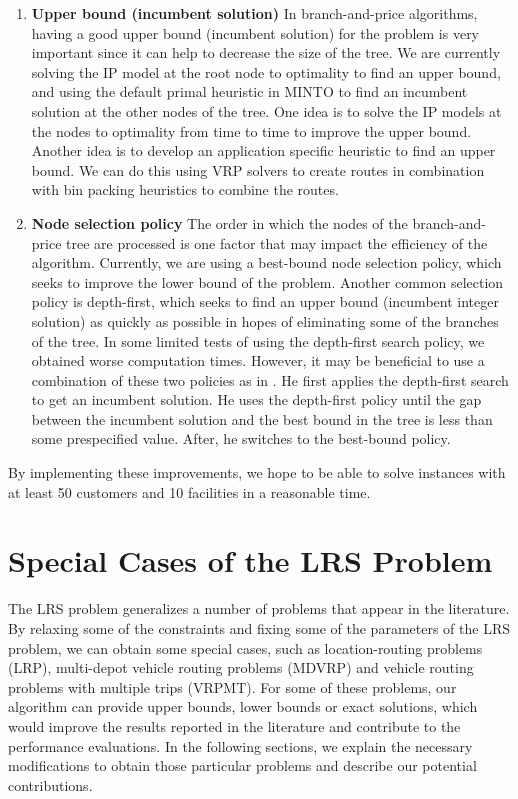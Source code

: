 \begin{enumerate}
\item {\bf Upper bound (incumbent solution)} In branch-and-price algorithms,
  having a good upper bound (incumbent solution) for the problem is very 
  important since it can help to decrease the size of the tree. We are currently 
  solving the IP model at the root node to optimality to find an upper bound, and
  using the default primal heuristic in MINTO to find an incumbent solution at
  the other nodes of the tree. One idea is to solve the IP models at the nodes 
  to optimality from time to time to improve the upper bound. Another idea is to 
  develop an application specific heuristic to find an upper bound. We can do 
  this using VRP solvers to create routes in combination with bin packing 
  heuristics to combine the routes.
\item {\bf Node selection policy} The order in which the nodes of the 
  branch-and-price tree are processed is one factor that may impact the 
  efficiency of the algorithm. Currently, we are using a best-bound node selection
  policy, which seeks to improve the lower bound of the problem. Another common
  selection policy is depth-first, which seeks to find an upper bound 
  (incumbent integer solution) as quickly as possible in hopes of eliminating 
  some of the branches of the tree. In some limited tests of using the depth-first 
  search policy, we obtained worse computation times. However, it may be 
  beneficial to use a combination of these two policies as in \citet{Vanderbeck}.
  He first applies the depth-first search to get an incumbent solution. He uses 
  the depth-first policy until the gap between the incumbent solution and the best 
  bound in the tree is less than some prespecified value. After, he switches to 
  the best-bound policy. 
\end{enumerate}
By implementing these improvements, we hope to be able to solve instances
with at least 50 customers and 10 facilities in a reasonable time.   

\section{Special Cases of the LRS Problem}
\label{sepecial-cases}
The LRS problem generalizes a number of problems that appear in the literature. 
By relaxing some of the constraints and fixing some of the parameters of the 
LRS problem, we can obtain some special cases, such as location-routing problems 
(LRP), multi-depot vehicle routing problems (MDVRP) and vehicle routing problems with 
multiple trips (VRPMT). For some of these problems, our algorithm can provide
upper bounds, lower bounds or exact solutions, which would improve the results
reported in the literature and contribute to the performance evaluations. In the 
following sections, we explain the necessary modifications  to obtain those particular 
problems and describe our potential contributions.

